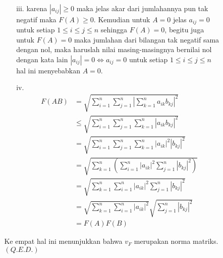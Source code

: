 \documentclass[11pt,a4paper]{article}
\newcommand{\ds}{\displaystyle}
\theoremstyle{plain}
\theoremstyle{definition}
\theoremstyle{remark}
\begin{document}
\begin{enumerate}
\begin{enumerate}
\begin{enumerate}
\begin{enumerate}
\begin{align*}
			\end{align*}
			\item[iii.] karena $|a_{ij}|\geq 0$ maka jelas akar dari jumlahannya pun tak negatif maka $F(A)\geq 0$. Kemudian untuk $A=0$ jelas $a_{ij}=0$ untuk setiap $1\leq i \leq j \leq n$ sehingga $F(A)=0$, begitu juga untuk $F(A)=0$ maka jumlahan dari bilangan tak negatif sama dengan nol, maka haruslah nilai masing-masingnya bernilai nol dengan kata lain $\left|a_{ij}\right|=0 \Leftrightarrow a_{ij}=0$ untuk setiap $1\leq i \leq j \leq n$ hal ini menyebabkan $A=0$. 
			\item[iv.] 
			\begin{align*}
			F(AB) &= \ds \sqrt{\sum_{i=1}^{n} \sum_{j=1}^{n} \left| \sum_{k=1}^{n} a_{ik}b_{kj}\right|^{2}} \\
			&\leq \ds \sqrt{\sum_{i=1}^{n} \sum_{j=1}^{n} \sum_{k=1}^{n} \left| a_{ik}b_{kj}\right|^{2}} \\
			&= \ds \sqrt{\sum_{i=1}^{n} \sum_{j=1}^{n} \sum_{k=1}^{n} \left| a_{ik} \right|^{2} \left|b_{kj}\right|^{2}} \\
			&= \ds \sqrt{\sum_{k=1}^{n} \left(\sum_{i=1}^{n} \left| a_{ik} \right|^{2} \sum_{j=1}^{n}  \left|b_{kj}\right|^{2}\right)} \\
			&= \ds \sqrt{\sum_{k=1}^{n} \sum_{i=1}^{n} \left| a_{ik} \right|^{2} \sum_{j=1}^{n}  \left|b_{kj}\right|^{2}} \\
			&= \ds \sqrt{\sum_{k=1}^{n} \sum_{i=1}^{n} \left| a_{ik} \right|^{2}} \sqrt{\sum_{j=1}^{n}  \left|b_{kj}\right|^{2}} \\
			&= F(A) F(B)
			\end{align*}
		\end{enumerate}
		Ke empat hal ini menunjukkan bahwa $v_{F}$ merupakan norma matriks. $(Q.E.D.)$
	\end{enumerate}
	
	
	
	
\end{enumerate}





	













\end{enumerate}
\end{document}
